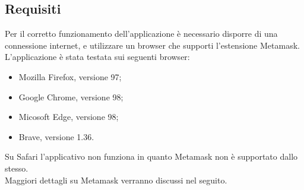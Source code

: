 \subsection{Requisiti}
Per il corretto funzionamento dell'applicazione è necessario disporre di una connessione internet, e utilizzare un browser che supporti l'estensione Metamask.
L'applicazione è stata testata sui seguenti browser:
\begin{itemize}
    \item Mozilla Firefox, versione 97;
    \item Google Chrome, versione 98;
    \item Micosoft Edge, versione 98;
    \item Brave, versione 1.36.
\end{itemize}
Su Safari l'applicativo non funziona in quanto Metamask non è supportato dallo stesso.\\
Maggiori dettagli su Metamask verranno discussi nel seguito.




